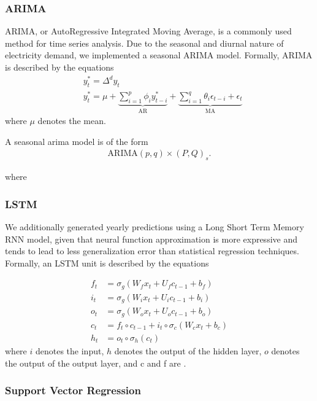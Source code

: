 \documentclass[plain]{article}
\newcommand{\1}{\mathbbm{1}}
\begin{document}
\subsubsection{ARIMA}
ARIMA, or AutoRegressive Integrated Moving Average, is a commonly used method for time series analysis. Due to the seasonal and diurnal nature of electricity demand, we implemented a seasonal ARIMA model. Formally, ARIMA is described by the equations
\begin{align}
&y_{t}^{*}=\Delta^{d} y_{t} \\
&y_{t}^{*}=\mu+\underbrace{\sum_{i=1}^{p} \phi_{i} y_{t-i}^{*}}_{\mathrm{AR}}+\underbrace{\sum_{i=1}^{q} \theta_{i} \epsilon_{t-i}+\epsilon_{t}}_{\mathrm{MA}}
\end{align}
where $\mu$ denotes the mean.

A seasonal arima model is of the form 
\begin{align}
	\text{ARIMA}(p,q) \times (P,Q)_s
.\end{align}

where 

\subsubsection{LSTM}
We additionally generated yearly predictions using a Long Short Term Memory RNN model, given that neural function approximation is more expressive and tends to lead to less generalization error than statistical regression techniques. Formally, an LSTM unit is described by the equations

\begin{align}
f_{t} &=\sigma_{g}\left(W_{f} x_{t}+U_{f} c_{t-1}+b_{f}\right) \\
i_{t} &=\sigma_{g}\left(W_{i} x_{t}+U_{i} c_{t-1}+b_{i}\right) \\
o_{t} &=\sigma_{g}\left(W_{o} x_{t}+U_{o} c_{t-1}+b_{o}\right) \\
c_{t} &=f_{t} \circ c_{t-1}+i_{t} \circ \sigma_{c}\left(W_{c} x_{t}+b_{c}\right) \\
h_{t} &=o_{t} \circ \sigma_{h}\left(c_{t}\right)
\end{align}
where $i$ denotes the input, $h$ denotes the output of the hidden layer, $o$ denotes the output of the output layer, and c and f are .
\subsubsection{Support Vector Regression}
\end{document}
